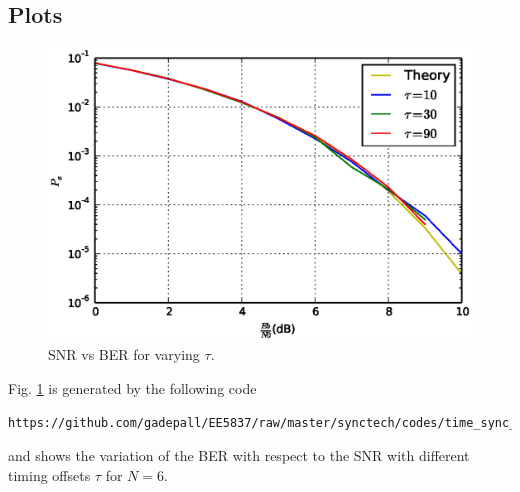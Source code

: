 \documentclass[journal,12pt,twocolumn]{IEEEtran}
\begin{document}
\subsection{Plots}
\begin{figure}
\begin{center}
\includegraphics[width=\columnwidth]{./figs/Different_timeoffsets_snrvsber.eps}
\end{center}
\caption{SNR vs BER for varying $\tau$.}
\label{fig:difftoff}
\end{figure}
%

%
Fig. \ref{fig:difftoff} is generated by the following code
\begin{lstlisting}
https://github.com/gadepall/EE5837/raw/master/synctech/codes/time_sync_offsets.py
\end{lstlisting}
and shows the variation of the BER with respect to the SNR  with 
different timing offsets $\tau$ for $N = 6$.
\end{document}
